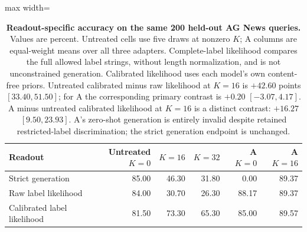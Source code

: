 \begin{table}[p]
\centering\color{blue}
\caption{\textbf{Readout-specific accuracy on the same 200 held-out AG News queries.} Values are percent. Untreated cells use five draws at nonzero $K$; A columns are equal-weight means over all three adapters. Complete-label likelihood compares the full allowed label strings, without length normalization, and is not unconstrained generation. Calibrated likelihood uses each model's own content-free priors. Untreated calibrated minus raw likelihood at $K=16$ is $+42.60$ points $[33.40,51.50]$; for A the corresponding primary contrast is $+0.20$ $[-3.07,4.17]$. A minus untreated calibrated likelihood at $K=16$ is a distinct contrast: $+16.27$ $[9.50,23.93]$. A's zero-shot generation is entirely invalid despite retained restricted-label discrimination; the strict generation endpoint is unchanged.}
\label{stab:final_readouts}
\footnotesize
\begin{adjustbox}{max width=\textwidth}
\begin{tabular}{lrrrrr}
\toprule
Readout & Untreated $K=0$ & $K=16$ & $K=32$ & A $K=0$ & A $K=16$ \\
\midrule
Strict generation & 85.00 & 46.30 & 31.80 & 0.00 & 89.37 \\
Raw label likelihood & 84.00 & 30.70 & 26.30 & 88.17 & 89.37 \\
Calibrated label likelihood & 81.50 & 73.30 & 65.30 & 85.00 & 89.57 \\
\bottomrule
\end{tabular}
\end{adjustbox}
\end{table}

